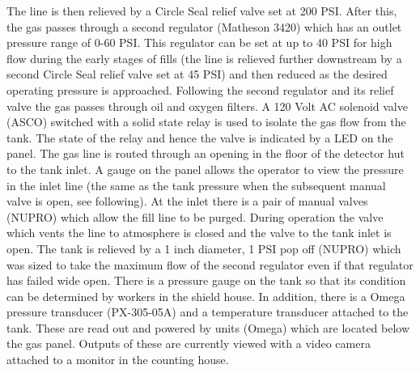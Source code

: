 {{The line is then relieved by a Circle Seal relief valve set at 200 PSI.
After this, the gas passes through a second regulator (Matheson 3420)
which has an outlet pressure range of 0-60 PSI. This regulator can be set at
up to 40 PSI for high flow during the early stages of fills
(the line is relieved further downstream by a second
Circle Seal relief valve set at 45 PSI) and then reduced as
the desired operating pressure is approached. Following the second regulator
and its relief valve the gas passes through oil and oxygen filters.
A 120 Volt AC solenoid valve (ASCO) switched with a solid state
relay is used to isolate the gas flow from the tank. The state of
the relay and hence the valve is indicated by a LED on the panel.
The gas line is routed through an opening in the floor of the detector hut
to the tank inlet. A gauge on the panel allows the operator to view
the pressure in the inlet line (the same as the tank pressure
when the subsequent manual valve is open, see following).
At the inlet there is a pair of manual valves (NUPRO)
which allow the fill line to be purged.
During operation the valve which vents the
line to atmosphere is closed and the valve to the tank inlet is open.
The tank is relieved by a 1 inch diameter, 1 PSI pop off (NUPRO) which was
sized to take the
maximum flow of the second regulator even if that regulator has failed
wide open. There is a pressure gauge on the tank so that its condition
can be determined by workers in the shield house. In addition,
there is a Omega pressure transducer (PX-305-05A) and a temperature
transducer attached to the tank. These are read out and powered by
units (Omega) which are located below the gas panel.  Outputs of these
are currently viewed with a video camera attached
to a monitor in the counting house.

}}
